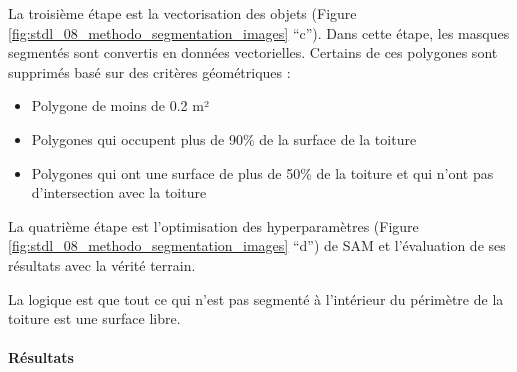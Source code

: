 \par{La troisième étape est la vectorisation des objets (Figure \ref{fig:stdl_08_methodo_segmentation_images} ``c''). Dans cette étape, les masques segmentés sont convertis en données vectorielles. Certains de ces polygones sont supprimés basé sur des critères géométriques :}
\begin{itemize}
    \item Polygone de moins de 0.2 m²
    \item Polygones qui occupent plus de 90\% de la surface de la toiture
    \item Polygones qui ont une surface de plus de 50\% de la toiture et qui n'ont pas d'intersection avec la toiture
\end{itemize}

\par{La quatrième étape est l'optimisation des hyperparamètres (Figure \ref{fig:stdl_08_methodo_segmentation_images} ``d'') de SAM et l'évaluation de ses résultats avec la vérité terrain.}

\par{La logique est que tout ce qui n'est pas segmenté à l'intérieur du périmètre de la toiture est une surface libre.}

\newpage
\paragraph{Résultats}

